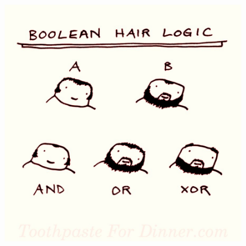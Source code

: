 \begin{frame}
    \begin{center}
        \includegraphics[width=0.8\textwidth]{boolean_hair_logic}
    \end{center}
\end{frame}

